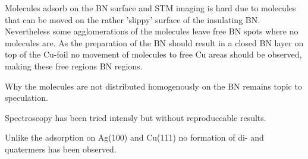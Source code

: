 Molecules adsorb on the BN surface and STM imaging is hard due to molecules that can be moved on the rather 'slippy' surface of the insulating BN. Nevertheless some agglomerations of the molecules leave free BN spots where no molecules are. As the preparation of the BN should result in a closed BN layer on top of the Cu-foil no movement of molecules to free Cu areas should be observed, making these free regions BN regions.

Why the molecules are not distributed homogenously on the BN remains topic to speculation.

Spectroscopy has been tried intensly but without reproduceable results.

Unlike the adsorption on Ag(100) and Cu(111) no formation of di- and quatermers has been observed.